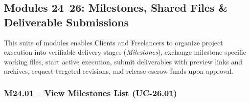 
\newpage
\subsection{Modules 24--26: Milestones, Shared Files \& Deliverable Submissions}

This suite of modules enables Clients and Freelancers to organize project execution into verifiable delivery stages (\textit{Milestones}), exchange milestone-specific working files, start active execution, submit deliverables with preview links and archives, request targeted revisions, and release escrow funds upon approval.

\subsubsection{M24.01 -- View Milestones List (UC-26.01)}

